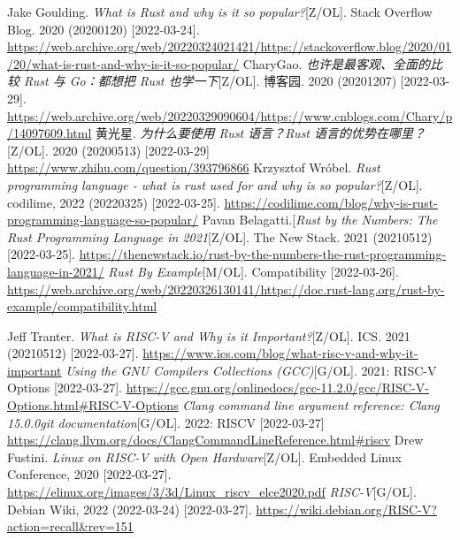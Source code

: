 \documentclass{../runikraft-report}
\begin{document}
\begin{thebibliography}{99}
Jake Goulding. \textit{What is Rust and why is it so popular?}[Z/OL]. Stack Overflow Blog. 2020 (20200120) [2022-03-24]. \url{https://web.archive.org/web/20220324021421/https://stackoverflow.blog/2020/01/20/what-is-rust-and-why-is-it-so-popular/}
 CharyGao. \textit{也许是最客观、全面的比较 Rust 与 Go：都想把 Rust 也学一下}[Z/OL]. 博客园. 2020 (20201207) [2022-03-29]. \url{https://web.archive.org/web/20220329090604/https://www.cnblogs.com/Chary/p/14097609.html}
 黄光星. \textit{为什么要使用 Rust 语言？Rust 语言的优势在哪里？}[Z/OL].
2020 (20200513) [2022-03-29] \url{https://www.zhihu.com/question/393796866}
 Krzysztof Wróbel. \textit{Rust programming language - what is rust used for and why is so popular?}[Z/OL]. codilime, 2022 (20220325) [2022-03-25]. \url{https://codilime.com/blog/why-is-rust-programming-language-so-popular/}
 Pavan Belagatti.[\textit{Rust by the Numbers: The Rust Programming Language in 2021}[Z/OL]. The New Stack. 2021 (20210512) [2022-03-25]. \url{https://thenewstack.io/rust-by-the-numbers-the-rust-programming-language-in-2021/}
 \textit{Rust By Example}[M/OL]. Compatibility [2022-03-26]. \url{https://web.archive.org/web/20220326130141/https://doc.rust-lang.org/rust-by-example/compatibility.html}

 Jeff Tranter. \textit{What is RISC-V and Why is it Important?}[Z/OL]. ICS. 2021 (20210512) [2022-03-27]. \url{https://www.ics.com/blog/what-risc-v-and-why-it-important}
 \textit{Using the GNU Compilers Collections (GCC)}[G/OL]. 2021: RISC-V Options [2022-03-27]. \url{https://gcc.gnu.org/onlinedocs/gcc-11.2.0/gcc/RISC-V-Options.html#RISC-V-Options}
 \textit{Clang command line argument reference: Clang 15.0.0git documentation}[G/OL]. 2022: RISCV [2022-03-27] \url{https://clang.llvm.org/docs/ClangCommandLineReference.html#riscv}
 Drew Fustini. \textit{Linux on RISC-V
with Open Hardware}[Z/OL]. Embedded Linux Conference, 2020 [2022-03-27]. \url{https://elinux.org/images/3/3d/Linux_riscv_elce2020.pdf}
 \textit{RISC-V}[G/OL]. Debian Wiki, 2022 (2022-03-24) [2022-03-27]. \url{https://wiki.debian.org/RISC-V?action=recall&rev=151}


\end{thebibliography}
\end{document}
